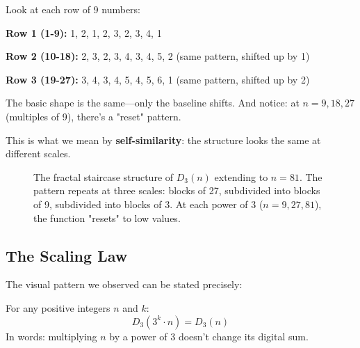 \begin{intuitive}
Look at each row of 9 numbers:

\textbf{Row 1 (1-9):} 1, 2, 1, 2, 3, 2, 3, 4, 1

\textbf{Row 2 (10-18):} 2, 3, 2, 3, 4, 3, 4, 5, 2 (same pattern, shifted up by 1)

\textbf{Row 3 (19-27):} 3, 4, 3, 4, 5, 4, 5, 6, 1 (same pattern, shifted up by 2)

The basic shape is the same—only the baseline shifts. And notice: at $n = 9, 18, 27$ (multiples of 9), there's a "reset" pattern.

This is what we mean by \textbf{self-similarity}: the structure looks the same at different scales.
\end{intuitive}

\begin{figure}[h]
\centering

\caption{The fractal staircase structure of $D_3(n)$ extending to $n = 81$. The pattern repeats at three scales: blocks of 27, subdivided into blocks of 9, subdivided into blocks of 3. At each power of 3 ($n = 9, 27, 81$), the function "resets" to low values.}
\label{fig:fractalstaircase}
\end{figure}

\subsection{The Scaling Law}
\label{subsec:scaling-law}


The visual pattern we observed can be stated precisely:

\begin{theorem}
\label{thm:d3-scaling}
For any positive integers $n$ and $k$:
\begin{equation}
D_3(3^k \cdot n) = D_3(n)
\end{equation}
In words: multiplying $n$ by a power of 3 doesn't change its digital sum.
\end{theorem}

